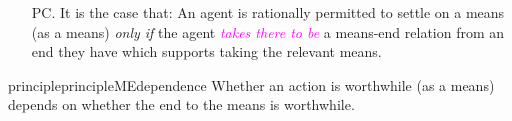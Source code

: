 \documentclass[10pt]{article}
\newcommand{\hozlinedash}[0]{%
  \noindent\hdashrule[0.5ex][c]{\textwidth}{.1pt}{2.5pt}
}
\begin{document}
\begin{enumerate}[label=P\arabic*., ref=(P\arabic*), resume]
\item[PC.] It is the case that:
  An agent is rationally permitted to settle on a means (as a means)  \emph{only if} the agent \textcolor{fuchsia}{\emph{takes there to be}} a means-end relation from an end they have which supports taking the relevant means.
\end{enumerate}

\begin{restatable}{principle}{principleMEdependence}\label{principle:dependence}
  Whether an action is worthwhile (as a means) depends on whether the end to the means is worthwhile.
\end{restatable}

\newpage


\end{document}
